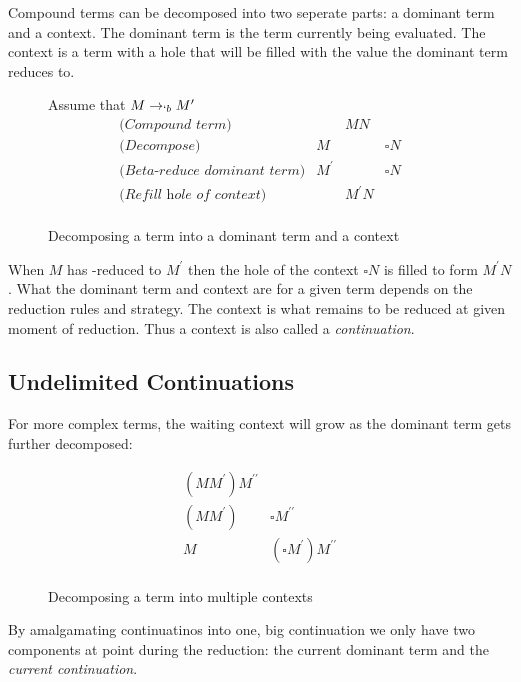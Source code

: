   Compound terms can be decomposed into two seperate parts: a dominant 
  term and a context. The dominant term is the term currently being 
  evaluated. The context is a term with a hole that will be filled with 
  the value the dominant term reduces to.
  
  \begin{figure}[!h]
    \hspace{1cm}Assume that $M \rightarrow_{`b} M^\prime$
    \[
    \begin{array}{lrcl}
    \textit{(Compound term)}&& MN \\
    \textit{(Decompose)}&M && \square N \\
    \textit{(Beta-reduce dominant term)}& M^\prime && \square N \\
    \textit{(Refill hole of context)}&& M^\prime N \\
    \end{array}
    \]
  \caption{Decomposing a term into a dominant term and a context}
  \end{figure}
  
  When $M$ has \bta-reduced to $M^\prime$ then the hole of the context
  $\square N$ is filled to form $M^\prime N$. What the dominant term and
  context are for a given term depends on the reduction rules and strategy. 
  The context is what remains to be reduced at given moment of reduction.
  Thus a context is also called a \emph{continuation}.
 
  \subsection{Undelimited Continuations} 
 
  For more complex terms, the waiting context will grow as the dominant
  term gets further decomposed:
  
  \begin{figure}[!h]
    \[
    \begin{array}{ll}
      (MM^\prime) M^{\prime\prime} \\
      (MM^\prime) & \square M^{\prime\prime} \\
      M & (\square M^\prime) M^{\prime\prime} \\
    \end{array}
    \]
  \caption{Decomposing a term into multiple contexts}
  \end{figure}

  By amalgamating continuatinos into one, big continuation we only have
  two components at point during the reduction: the current dominant term
  and the \emph{current continuation}. 
  
